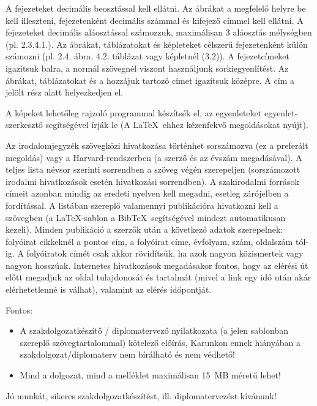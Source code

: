 A fejezeteket decimális beosztással kell ellátni. Az ábrákat a megfelelő helyre be kell illeszteni, fejezetenként decimális számmal és kifejező címmel kell ellátni. A fejezeteket decimális aláosztással számozzuk, maximálisan 3 aláosztás mélységben (pl. 2.3.4.1.). Az ábrákat, táblázatokat és képleteket célszerű fejezetenként külön számozni (pl. 2.4. ábra, 4.2. táblázat vagy képletnél (3.2)). A fejezetcímeket igazítsuk balra, a normál szövegnél viszont használjunk sorkiegyenlítést. Az ábrákat, táblázatokat és a hozzájuk tartozó címet igazítsuk középre. A cím a jelölt rész alatt helyezkedjen el.

A képeket lehetőleg rajzoló programmal készítsék el, az egyenleteket egyenlet-szerkesztő segítségével írják le (A \LaTeX~ehhez kézenfekvő megoldásokat nyújt).

Az irodalomjegyzék szövegközi hivatkozása történhet sorszámozva (ez a preferált megoldás) vagy a Harvard-rendszerben (a szerző és az évszám megadásával). A teljes lista névsor szerinti sorrendben a szöveg végén szerepeljen (sorszámozott irodalmi hivatkozások esetén hivatkozási sorrendben). A szakirodalmi források címeit azonban mindig az eredeti nyelven kell megadni, esetleg zárójelben a fordítással. A listában szereplő valamennyi publikációra hivatkozni kell a szövegben (a \LaTeX-sablon a Bib\TeX~segítségével mindezt automatikusan kezeli). Minden publikáció a szerzők után a következő adatok szerepelnek: folyóirat cikkeknél a pontos cím, a folyóirat címe, évfolyam, szám, oldalszám tól-ig. A folyóiratok címét csak akkor rövidítsük, ha azok nagyon közismertek vagy nagyon hosszúak. Internetes hivatkozások megadásakor fontos, hogy az elérési út előtt megadjuk az oldal tulajdonosát és tartalmát (mivel a link egy idő után akár elérhetetlenné is válhat), valamint az elérés időpontját.

\vspace{5mm}
Fontos:
\begin{itemize}
	\item A szakdolgozatkészítő / diplomatervező nyilatkozata (a jelen sablonban szereplő szövegtartalommal) kötelező előírás, Karunkon ennek hiányában a szakdolgozat/diplomaterv nem bírálható és nem védhető!
	\item Mind a dolgozat, mind a melléklet maximálisan 15~MB méretű lehet!
\end{itemize}

\vspace{5mm}
\begin{center}
Jó munkát, sikeres szakdolgozatkészítést, ill. diplomatervezést kívánunk!
\end{center}

\normalsize
\selectthesislanguage
